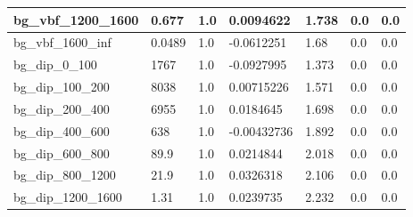 \documentclass[a4paper, 10pt]{article}
\begin{document}
\begin{table}[H]
\begin{center}
\begin{tabular}{|m{23.0mm}|m{23.0mm}|m{18.0mm}|m{19.0mm}|m{19.0mm}|m{19.0mm}|m{19.0mm}|}
      \hline
      {\cellcolor{white}         bg\_vbf\_1200\_1600}& {\cellcolor{white}         0.677}& {\cellcolor{white}         1.0}& {\cellcolor{white}         0.0094622}& {\cellcolor{white}         1.738}& {\cellcolor{green}         0.0}& {\cellcolor{green}         0.0}\\
      \hline
      {\cellcolor{white}         bg\_vbf\_1600\_inf}& {\cellcolor{white}         0.0489}& {\cellcolor{white}         1.0}& {\cellcolor{white}         -0.0612251}& {\cellcolor{white}         1.68}& {\cellcolor{green}         0.0}& {\cellcolor{green}         0.0}\\
      \hline
      {\cellcolor{white}         bg\_dip\_0\_100}& {\cellcolor{white}         1767}& {\cellcolor{white}         1.0}& {\cellcolor{white}         -0.0927995}& {\cellcolor{white}         1.373}& {\cellcolor{green}         0.0}& {\cellcolor{green}         0.0}\\
      \hline
      {\cellcolor{white}         bg\_dip\_100\_200}& {\cellcolor{white}         8038}& {\cellcolor{white}         1.0}& {\cellcolor{white}         0.00715226}& {\cellcolor{white}         1.571}& {\cellcolor{green}         0.0}& {\cellcolor{green}         0.0}\\
      \hline
      {\cellcolor{white}         bg\_dip\_200\_400}& {\cellcolor{white}         6955}& {\cellcolor{white}         1.0}& {\cellcolor{white}         0.0184645}& {\cellcolor{white}         1.698}& {\cellcolor{green}         0.0}& {\cellcolor{green}         0.0}\\
      \hline
      {\cellcolor{white}         bg\_dip\_400\_600}& {\cellcolor{white}         638}& {\cellcolor{white}         1.0}& {\cellcolor{white}         -0.00432736}& {\cellcolor{white}         1.892}& {\cellcolor{green}         0.0}& {\cellcolor{green}         0.0}\\
      \hline
      {\cellcolor{white}         bg\_dip\_600\_800}& {\cellcolor{white}         89.9}& {\cellcolor{white}         1.0}& {\cellcolor{white}         0.0214844}& {\cellcolor{white}         2.018}& {\cellcolor{green}         0.0}& {\cellcolor{green}         0.0}\\
      \hline
      {\cellcolor{white}         bg\_dip\_800\_1200}& {\cellcolor{white}         21.9}& {\cellcolor{white}         1.0}& {\cellcolor{white}         0.0326318}& {\cellcolor{white}         2.106}& {\cellcolor{green}         0.0}& {\cellcolor{green}         0.0}\\
      \hline
      {\cellcolor{white}         bg\_dip\_1200\_1600}& {\cellcolor{white}         1.31}& {\cellcolor{white}         1.0}& {\cellcolor{white}         0.0239735}& {\cellcolor{white}         2.232}& {\cellcolor{green}         0.0}& {\cellcolor{green}         0.0}\\

\end{tabular}
\end{center}
\end{table}
\end{document}
